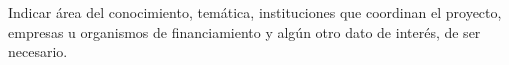 Indicar área del conocimiento, temática, instituciones que coordinan el proyecto, empresas u organismos de financiamiento y algún otro dato de interés, de ser necesario. 